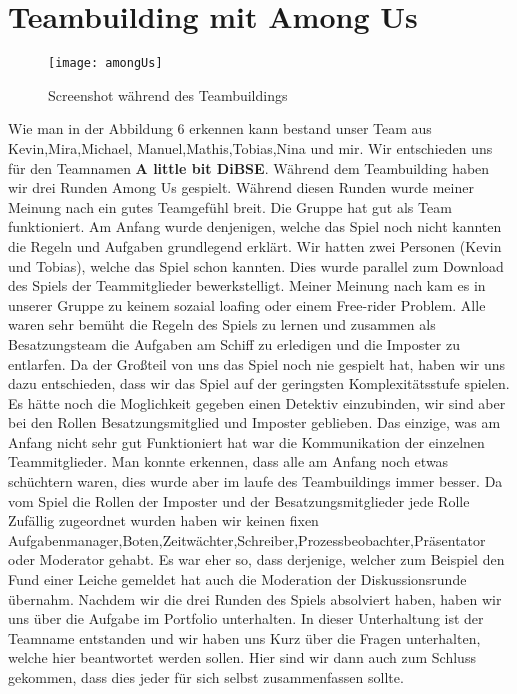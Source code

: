 \documentclass[12pt]{article}
\begin{document}
\section{Teambuilding mit Among Us}
\begin{figure}[h]
\begin{center}
\texttt{[image: amongUs]}
\end{center}
\caption{Screenshot während des Teambuildings}
\end{figure}
Wie man in der Abbildung 6 erkennen kann bestand unser Team aus Kevin,Mira,Michael, Manuel,Mathis,Tobias,Nina und mir. Wir entschieden uns für den Teamnamen \textbf{A little bit DiBSE}. Während dem Teambuilding haben wir drei Runden Among Us gespielt. Während diesen Runden wurde meiner Meinung nach ein gutes Teamgefühl breit. Die Gruppe hat gut als Team funktioniert. Am Anfang wurde denjenigen, welche das Spiel noch nicht kannten die Regeln und Aufgaben grundlegend erklärt. Wir hatten zwei Personen (Kevin und Tobias), welche das Spiel schon kannten. Dies wurde parallel zum Download des Spiels der Teammitglieder bewerkstelligt. Meiner Meinung nach kam es in unserer Gruppe zu keinem sozaial loafing oder einem Free-rider Problem. Alle waren sehr bemüht die Regeln des Spiels zu lernen und zusammen als Besatzungsteam die Aufgaben am Schiff zu erledigen und die Imposter zu entlarfen. Da der Großteil von uns das Spiel noch nie gespielt hat, haben wir uns dazu entschieden, dass wir das Spiel auf der geringsten Komplexitätsstufe spielen. Es hätte noch die Moglichkeit gegeben einen Detektiv einzubinden, wir sind aber bei den Rollen Besatzungsmitglied und Imposter geblieben. Das einzige, was am Anfang nicht sehr gut Funktioniert hat war die Kommunikation der einzelnen Teammitglieder. Man konnte erkennen, dass alle am Anfang noch etwas schüchtern waren, dies wurde aber im laufe des Teambuildings immer besser. Da vom Spiel die Rollen der Imposter und der Besatzungsmitglieder jede Rolle Zufällig zugeordnet wurden haben wir keinen fixen Aufgabenmanager,Boten,Zeitwächter,Schreiber,Prozessbeobachter,Präsentator oder Moderator gehabt. Es war eher so, dass derjenige, welcher zum Beispiel den Fund einer Leiche gemeldet hat auch die Moderation der Diskussionsrunde übernahm. Nachdem wir die drei Runden des Spiels  absolviert haben, haben wir uns über die Aufgabe im Portfolio unterhalten. In dieser Unterhaltung ist der Teamname entstanden und wir haben uns Kurz über die Fragen unterhalten, welche hier beantwortet werden sollen. Hier sind wir dann auch zum Schluss gekommen, dass dies jeder für sich selbst zusammenfassen sollte.\vspace{0.5cm}\\
\end{document}
